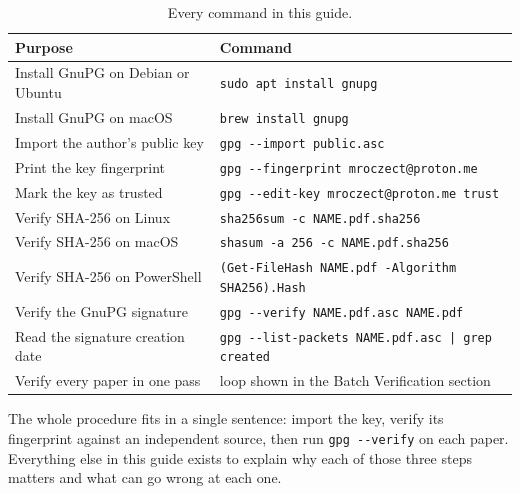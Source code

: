 \begin{table}[H]
	\centering
	\caption{Every command in this guide.}
	\label{tab:quick-reference}
	\footnotesize
	\begin{tabularx}{\textwidth}{l X}
		\toprule
		Purpose                           & Command                                                   \\
		\midrule
		Install GnuPG on Debian or Ubuntu & \texttt{sudo apt install gnupg}                           \\
		Install GnuPG on macOS            & \texttt{brew install gnupg}                               \\
		Import the author's public key    & \texttt{gpg -{}-import public.asc}                        \\
		Print the key fingerprint         & \texttt{gpg -{}-fingerprint mroczect@proton.me}           \\
		Mark the key as trusted           & \texttt{gpg -{}-edit-key mroczect@proton.me trust}        \\
		Verify SHA-256 on Linux           & \texttt{sha256sum -c NAME.pdf.sha256}                     \\
		Verify SHA-256 on macOS           & \texttt{shasum -a 256 -c NAME.pdf.sha256}                 \\
		Verify SHA-256 on PowerShell      & \texttt{(Get-FileHash NAME.pdf -Algorithm SHA256).Hash}   \\
		Verify the GnuPG signature        & \texttt{gpg -{}-verify NAME.pdf.asc NAME.pdf}             \\
		Read the signature creation date  & \texttt{gpg -{}-list-packets NAME.pdf.asc | grep created} \\
		Verify every paper in one pass    & loop shown in the Batch Verification section              \\
		\bottomrule
	\end{tabularx}
\end{table}

The whole procedure fits in a single sentence: import the key,
verify its fingerprint against an independent source, then run
\texttt{gpg -{}-verify} on each paper. Everything else in this
guide exists to explain why each of those three steps matters and
what can go wrong at each one.
